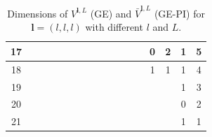 \documentclass{article}
\newcommand{\bV}{{\bar V}}
\numberwithin{equation}{section}
\def\bl{{\bm l}}
\begin{document}
\begin{table}[htb!]
{\begin{tabular}{|c|cc|cc|cc|cc|cc|cc|cc|cc|}
17 & \multicolumn{1}{c|}{} &  & \multicolumn{1}{c|}{} &  & \multicolumn{1}{c|}{} &  & \multicolumn{1}{c|}{} &  & \multicolumn{1}{c|}{} &  & \multicolumn{1}{c|}{} &  & \multicolumn{1}{c|}{0} & 2 & \multicolumn{1}{c|}{1} & 5 \\ \hline
18 & \multicolumn{1}{c|}{} &  & \multicolumn{1}{c|}{} &  & \multicolumn{1}{c|}{} &  & \multicolumn{1}{c|}{} &  & \multicolumn{1}{c|}{} &  & \multicolumn{1}{c|}{} &  & \multicolumn{1}{c|}{1} & 1 & \multicolumn{1}{c|}{1} & 4 \\ \hline
19 & \multicolumn{1}{c|}{} &  & \multicolumn{1}{c|}{} &  & \multicolumn{1}{c|}{} &  & \multicolumn{1}{c|}{} &  & \multicolumn{1}{c|}{} &  & \multicolumn{1}{c|}{} &  & \multicolumn{1}{c|}{} &  & \multicolumn{1}{c|}{1} & 3 \\ \hline
20 & \multicolumn{1}{c|}{} &  & \multicolumn{1}{c|}{} &  & \multicolumn{1}{c|}{} &  & \multicolumn{1}{c|}{} &  & \multicolumn{1}{c|}{} &  & \multicolumn{1}{c|}{} &  & \multicolumn{1}{c|}{} &  & \multicolumn{1}{c|}{0} & 2 \\ \hline
21 & \multicolumn{1}{c|}{} &  & \multicolumn{1}{c|}{} &  & \multicolumn{1}{c|}{} &  & \multicolumn{1}{c|}{} &  & \multicolumn{1}{c|}{} &  & \multicolumn{1}{c|}{} &  & \multicolumn{1}{c|}{} &  & \multicolumn{1}{c|}{1} & 1 \\ \hline
\end{tabular}%
}
\caption{Dimensions of $V^{\bl,L}$ (GE) and $\bV^{\bl,L}$ (GE-PI) for $\bl=(l,l,l)$ with different $l$ and $L$.}
\label{tab:n3}
\end{table}
\end{document}

